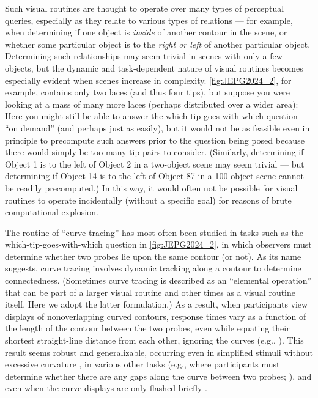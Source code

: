 Such visual routines are thought to operate over many types of perceptual queries, especially as they relate to various types of relations --- for example, when determining if one object is \textit{inside} of another contour in the scene, or whether some particular object is to the \textit{right or left} of another particular object. Determining such relationships may seem trivial in scenes with only a few objects, but the dynamic and task-dependent nature of visual routines becomes especially evident when scenes increase in complexity. \cref{fig:JEPG2024_2}, for example, contains only two laces (and thus four tips), but suppose you were looking at a mass of many more laces (perhaps distributed over a wider area): Here you might still be able to answer the which-tip-goes-with-which question “on demand” (and perhaps just as easily), but it would not be as feasible even in principle to precompute such answers prior to the question being posed because there would simply be too many tip pairs to consider. (Similarly, determining if Object 1 is to the left of Object 2 in a two-object scene may seem trivial --- but determining if Object 14 is to the left of Object 87 in a 100-object scene cannot be readily precomputed.) In this way, it would often not be possible for visual routines to operate incidentally (without a specific goal) for reasons of brute computational explosion.

The routine of “curve tracing” has most often been studied in tasks such as the which-tip-goes-with-which question in \cref{fig:JEPG2024_2}, in which observers must determine whether two probes lie upon the same contour (or not). As its name suggests, curve tracing involves dynamic tracking along a contour to determine connectedness. (Sometimes curve tracing is described as an “elemental operation” that can be part of a larger visual routine and other times as a visual routine itself. Here we adopt the latter formulation.) As a result, when participants view displays of nonoverlapping curved contours, response times vary as a function of the length of the contour between the two probes, even while equating their shortest straight-line distance from each other, ignoring the curves (e.g., \cite{jolicoeur_curve_1986}). This result seems robust and generalizable, occurring even in simplified stimuli without excessive curvature \parencite{pringle_mental_1988}, in various other tasks (e.g., where participants must determine whether there are any gaps along the curve between two probes; \cite{jolicoeur_curve_1986}), and even when the curve displays are only flashed briefly \parencite{jolicoeur_visual_1991}.


